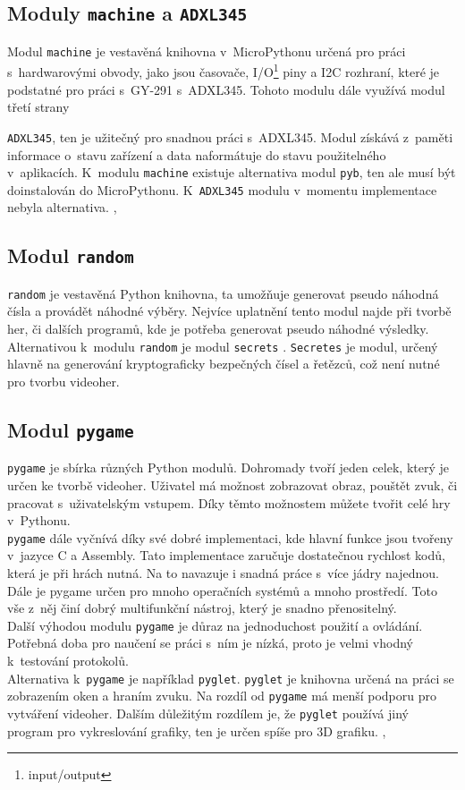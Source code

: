 \documentclass[12pt]{report}			%
\begin{document}
\subsection{Moduly \texttt{machine} a \texttt{ADXL345}}
Modul \texttt{machine} je vestavěná knihovna v~MicroPythonu určená pro práci s~hardwarovými obvody, jako jsou časovače, I/O\footnote{input/output} piny a I2C rozhraní, které je podstatné pro práci s~GY-291 s~ADXL345. Tohoto modulu dále využívá modul třetí strany \cite{machine}

\texttt{ADXL345}, ten je užitečný pro snadnou práci s~ADXL345. Modul získává z~paměti informace o~stavu zařízení a data naformátuje do stavu použitelného v~aplikacích. K~modulu \texttt{machine} existuje alternativa modul \texttt{pyb}, ten ale musí být doinstalován do MicroPythonu. K~\texttt{ADXL345} modulu v~momentu implementace nebyla alternativa. \cite{pyb}, \cite{adxl}


\subsection{Modul \texttt{random}}
\texttt{random} je vestavěná Python knihovna, ta umožňuje generovat pseudo náhodná čísla a provádět náhodné výběry. Nejvíce uplatnění tento modul najde při tvorbě her, či dalších programů, kde je potřeba generovat pseudo náhodné výsledky. \cite{random}
\\
Alternativou k~modulu \texttt{random} je modul
 \texttt{secrets}
 . \texttt{Secretes} je modul, určený hlavně na generování kryptograficky bezpečných čísel a řetězců, což není nutné pro tvorbu videoher. \cite{secretes}
 
 
\subsection{Modul \texttt{pygame}}
\texttt{pygame} je sbírka různých Python modulů. Dohromady tvoří jeden celek, který je určen ke tvorbě videoher. Uživatel má možnost zobrazovat obraz, pouštět zvuk, či pracovat s~uživatelským vstupem. Díky těmto možnostem můžete tvořit celé hry v~Pythonu. \cite{pygame}
\\
\texttt{pygame} dále vyčnívá díky své dobré implementaci, kde hlavní funkce jsou tvořeny v~jazyce C a Assembly. Tato implementace zaručuje dostatečnou rychlost kodů, která je při hrách nutná. Na to navazuje i snadná práce s~více jádry najednou. Dále je pygame určen pro mnoho operačních systémů a mnoho prostředí. Toto vše z~něj činí dobrý multifunkční nástroj, který je snadno přenositelný. 
\\
Další výhodou modulu \texttt{pygame} je důraz na jednoduchost použití a ovládání. Potřebná doba pro naučení se práci s~ním je nízká, proto je velmi vhodný k~testování protokolů.  
\\
Alternativa k~\texttt{pygame} je například \texttt{pyglet}. \texttt{pyglet} je knihovna určená na práci se zobrazením oken a hraním zvuku. Na rozdíl od \texttt{pygame} má menší podporu pro vytváření videoher. Dalším důležitým rozdílem je, že \texttt{pyglet} používá jiný program pro vykreslování grafiky, ten je určen spíše pro 3D grafiku. \cite{pygame}, \cite{pyglet}
\end{document}
